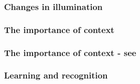 \documentclass[10pt]{beamer}
\begin{document}
\begin{frame}
  \frametitle{Changes in illumination}
\end{frame}

\begin{frame}
  \frametitle{The importance of context}
\end{frame}

\begin{frame}
  \frametitle{The importance of context - see}
\end{frame}

\begin{frame}
  \frametitle{Learning and recognition}
\end{frame}
\end{document}
